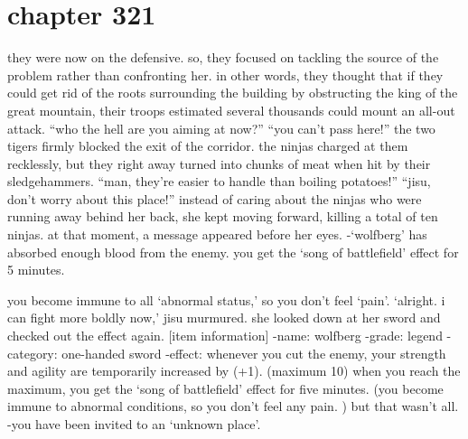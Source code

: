 \section{chapter 321}

                            they were now on the defensive.
 so, they focused on tackling the source of the problem rather than confronting her.
 in other words, they thought that if they could get rid of the roots surrounding the building by obstructing the king of the great mountain, their troops estimated several thousands could mount an all-out attack.
 “who the hell are you aiming at now?” “you can’t pass here!” the two tigers firmly blocked the exit of the corridor.
 the ninjas charged at them recklessly, but they right away turned into chunks of meat when hit by their sledgehammers.
 “man, they’re easier to handle than boiling potatoes!” “jisu, don’t worry about this place!” instead of caring about the ninjas who were running away behind her back, she kept moving forward, killing a total of ten ninjas.
 at that moment, a message appeared before her eyes.
 -‘wolfberg’ has absorbed enough blood from the enemy.
 you get the ‘song of battlefield’ effect for 5 minutes.






you become immune to all ‘abnormal status,’ so you don’t feel ‘pain’.
 ‘alright.
 i can fight more boldly now,’ jisu murmured.
 she looked down at her sword and checked out the effect again.
 [item information] -name: wolfberg -grade: legend -category: one-handed sword -effect: whenever you cut the enemy, your strength and agility are temporarily increased by (+1).
 (maximum 10) when you reach the maximum, you get the ‘song of battlefield’ effect for five minutes.
 (you become immune to abnormal conditions, so you don’t feel any pain.
) but that wasn’t all.
 -you have been invited to an ‘unknown place’.

